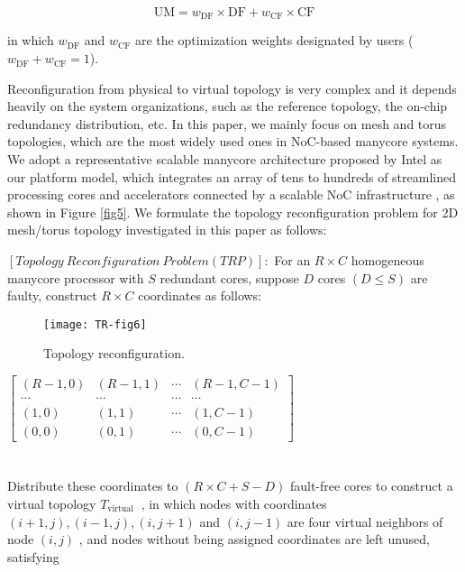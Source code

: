  \begin{equation}
     \mathrm{UM}=w_{\mathrm{DF}} \times \mathrm{DF}+w_{\mathrm{CF}} \times \mathrm{CF}
             \label{eq4}
 \end{equation}

 in which $w_{\mathrm{DF}}$ and   $w_{\mathrm{CF}} $    are the optimization weights designated by users ($w_{\mathrm{DF}} + w_{\mathrm{CF}} =1$).

Reconfiguration from physical to virtual topology is very complex and it depends heavily on the system organizations, such as the reference topology, the on-chip redundancy distribution, etc. In this paper, we mainly focus on mesh and torus topologies, which are the most widely used ones in NoC-based manycore systems. We adopt a representative scalable manycore architecture proposed by Intel as our platform model, which integrates an array of tens to hundreds of streamlined processing cores and accelerators connected by a scalable NoC infrastructure \cite{computingfew}, as shown in Figure \ref{fig5}. We formulate the topology reconfiguration problem for 2D mesh/torus topology investigated in this paper as follows:

$[Topology\ Reconfiguration\ Problem (TRP)]:$ For an $R \times C$ homogeneous manycore processor with $S$ redundant cores, suppose $D$ cores $(D \leq S)$   are faulty, construct $R \times C$ coordinates as follows:\\

 \begin{figure}[t]
     \centering
         \texttt{[image: TR-fig6]}
           \caption{Topology reconfiguration.            }
              \label{fig6}
 \end{figure}

 $\left[\begin{array}{cccc}(R-1,0) & (R-1,1) & \cdots & (R-1, C-1) \\ \cdots & \cdots & \cdots & \cdots \\ (1,0) & (1,1) & \cdots & (1, C-1) \\ (0,0) & (0,1) & \cdots & (0, C-1)\end{array}\right]$ \\
     \\
     \\ Distribute these coordinates to $(R \times C+S-D)$  fault-free cores to construct a virtual topology $T_{\text {virtual }}$ , in which nodes with coordinates $(i+1, j),(i-1, j),(i, j+1)$  and  $(i, j-1)$ are four virtual neighbors of node $(i, j)$ , and nodes without being assigned coordinates are left unused, satisfying \\

